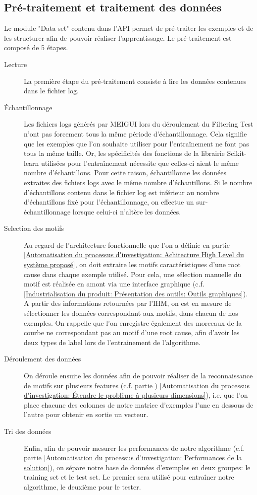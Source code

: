 \subsection{Pré-traitement et traitement des données}
\label{Industrialisation du produit: API: Pré-traitement et traitement des données}
Le module "Data set" contenu dans l'API permet de pré-traiter les exemples et de les structurer afin de pouvoir réaliser l'apprentissage. 
Le pré-traitement est composé de 5 étapes.
\begin{description}
	\item [Lecture] La première étape du pré-traitement consiste à lire les données contenues dans le fichier log. 
	\item [Échantillonnage] Les fichiers logs générés par MEIGUI lors du déroulement du Filtering Test n'ont pas forcement tous la même période d'échantillonnage. Cela signifie que les exemples que l'on souhaite utiliser pour l'entraînement ne font pas tous la même taille. Or, les spécificités des fonctions de la librairie Scikit-learn utilisées pour l'entraînement nécessite que celles-ci aient le même nombre d'échantillons. Pour cette raison, échantillonne les données extraites des fichiers logs avec le même nombre d'échantillons. Si le nombre d'échantillons contenu dans le fichier log est inférieur au nombre d'échantillons fixé pour l'échantillonnage, on effectue un sur-échantillonnage lorsque celui-ci n'altère les données. 
	\item [Selection des motifs] Au regard de l'architecture fonctionnelle que l'on a définie en partie \ref{Automatisation du processus d'investigation: Achitecture High Level du système proposé}, on doit extraire les motifs caractéristiques d'une root cause dans chaque exemple utilisé. Pour cela, une sélection manuelle du motif est réalisée en amont via une interface graphique (c.f. \ref{Industrialisation du produit: Présentation des outils: Outils graphiques}). A partir des informations retournées par l'IHM, on est en mesure de sélectionner les données correspondant aux motifs, dans chacun de nos exemples. On rappelle que l'on enregistre également des morceaux de la courbe ne correspondant pas au motif d'une root cause, afin d'avoir les deux types de label lors de l'entrainement de l'algorithme.
	\item [Déroulement des données] On déroule ensuite les données afin de pouvoir réaliser de la reconnaissance de motifs sur plusieurs features (c.f. partie ) \ref{Automatisation du processus d'investigation: Étendre le problème à plusieurs dimensions}), i.e. que l'on place chacune des colonnes de notre matrice d'exemples l'une en dessous de l'autre pour obtenir en sortie un vecteur. 
	\item [Tri des données] Enfin, afin de pouvoir mesurer les performances de notre algorithme (c.f. partie \ref{Automatisation du processus d'investigation: Performances de la solution}), on sépare notre base de données d'exemples en deux groupes: le training set et le test set. Le premier sera utilisé pour entraîner notre algorithme, le deuxième pour le tester. 
\end{description}

